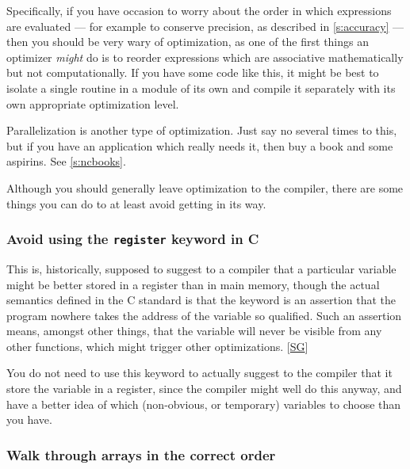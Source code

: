 \documentclass[11pt,oneside,chapters]{starlink}
\begin{document}
Specifically, if you have occasion to worry about the
order in which expressions are evaluated --- for example to
conserve precision, as described in \ref{s:accuracy}
--- then you should be very wary of optimization, as one of
the first things an optimizer \emph{might} do is to
reorder expressions which are associative mathematically
but not computationally.  If you have some code like this,
it might be best to isolate a single routine in a module
of its own and compile it separately with its own
appropriate optimization level.

Parallelization is another type of optimization.  Just
say no several times to this, but if you have an
application which really needs it, then buy a book and
some aspirins.  See \ref{s:ncbooks}.

Although you should generally leave optimization to the
compiler, there are some things you can do to at least
avoid getting in its way.

\subsubsection{Avoid using the \texttt{register} keyword in C}


This is, historically, supposed to suggest to a
compiler that a particular variable might be better
stored in a register than in main memory, though the
actual semantics defined in the C standard is that the
keyword is an assertion that the program nowhere takes
the address of the variable so qualified.  Such an
assertion means, amongst other things, that the variable
will never be visible from any other functions, which
might trigger other optimizations.
[\hyperlink{ta:sg}{SG}]

You do not need to use this keyword to actually suggest
to the compiler that it store the variable in a
register, since the compiler might well do this anyway,
and have a better idea of which (non-obvious, or
temporary) variables to choose than you have.

\subsubsection{Walk through arrays in the correct order}
\label{s:arrays}

\end{document}
